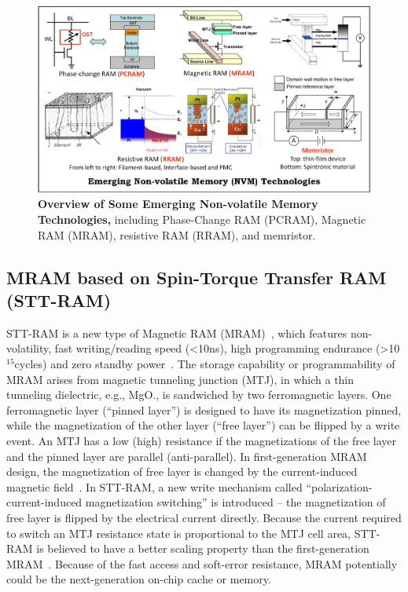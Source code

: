 \begin{figure}
\centering
\includegraphics[width=1\textwidth]{./figure/1_technology_half.pdf}
\vspace{-10pt}
\caption{\textbf{Overview of Some Emerging Non-volatile Memory Technologies,} including Phase-Change RAM (PCRAM), Magnetic RAM (MRAM), resistive RAM (RRAM), and memristor. }
\label{technology}
\vspace{-10pt}
\end{figure}

\subsection{MRAM based on Spin-Torque Transfer RAM (STT-RAM)}
STT-RAM is a new type of Magnetic RAM (MRAM)~\cite{ITRS07,Hosomi05,MRAM:TTO+06,MRAM:ZBM+06,mram:ibm:maffitt}, which features non-volatility, fast writing/reading speed (\textless 10ns), high programming endurance (\textgreater 10$^{15}$cycles) and zero standby power~\cite{ITRS07}. The storage capability or programmability of MRAM arises from magnetic tunneling junction (MTJ), in which a thin tunneling dielectric, e.g., MgO., is sandwiched by two ferromagnetic layers. One ferromagnetic layer (``pinned layer'') is designed to have its magnetization pinned, while the magnetization of the other layer (``free layer'') can be flipped by a write event. An MTJ has a low (high) resistance if the magnetizations of the free layer and the pinned layer are parallel (anti-parallel). In first-generation MRAM design, the magnetization of free layer is changed by the current-induced magnetic field~\cite{Motoyoshi04,Ha04}. In STT-RAM, a new write mechanism called ``polarization-current-induced magnetization switching'' is introduced -- the magnetization of free layer is flipped by the electrical current directly. Because the current required to switch an MTJ resistance state is proportional to the MTJ cell area, STT-RAM is believed to have a better scaling property than the first-generation MRAM~\cite{Hosomi05,Kawahara07,MRAM:TTO+06,Diao07,Salahuddin07,Beach08,Kishi08}. Because of the fast access and soft-error resistance, MRAM potentially could be the next-generation on-chip cache or memory.

